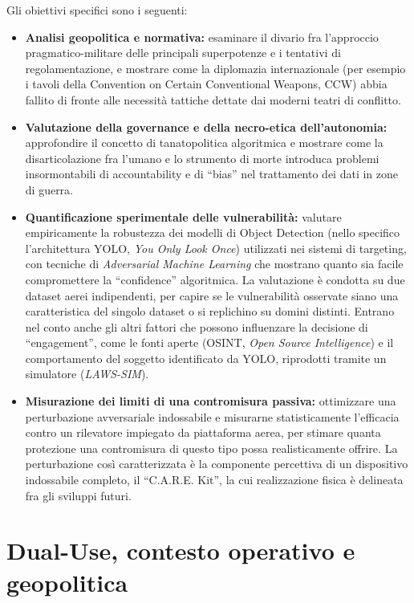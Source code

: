 \documentclass[a4paper,12pt]{report}
\begin{document}
Gli obiettivi specifici sono i seguenti:
\begin{itemize}
    \item \textbf{Analisi geopolitica e normativa:} esaminare il divario fra l'approccio pragmatico-militare delle principali superpotenze e i tentativi di regolamentazione, e mostrare come la diplomazia internazionale (per esempio i tavoli della Convention on Certain Conventional Weapons, CCW) abbia fallito di fronte alle necessità tattiche dettate dai moderni teatri di conflitto.
    \item \textbf{Valutazione della governance e della necro-etica dell'autonomia:} approfondire il concetto di tanatopolitica algoritmica e mostrare come la disarticolazione fra l'umano e lo strumento di morte introduca problemi insormontabili di accountability e di ``bias'' nel trattamento dei dati in zone di guerra.
    \item \textbf{Quantificazione sperimentale delle vulnerabilità:} valutare empiricamente la robustezza dei modelli di Object Detection (nello specifico l'architettura YOLO, \textit{You Only Look Once}) utilizzati nei sistemi di targeting, con tecniche di \textit{Adversarial Machine Learning} che mostrano quanto sia facile compromettere la ``confidence'' algoritmica. La valutazione è condotta su due dataset aerei indipendenti, per capire se le vulnerabilità osservate siano una caratteristica del singolo dataset o si replichino su domini distinti. Entrano nel conto anche gli altri fattori che possono influenzare la decisione di ``engagement'', come le fonti aperte (OSINT, \textit{Open Source Intelligence}) e il comportamento del soggetto identificato da YOLO, riprodotti tramite un simulatore (\textit{LAWS-SIM}).
    \item \textbf{Misurazione dei limiti di una contromisura passiva:} ottimizzare una perturbazione avversariale indossabile e misurarne statisticamente l'efficacia contro un rilevatore impiegato da piattaforma aerea, per stimare quanta protezione una contromisura di questo tipo possa realisticamente offrire. La perturbazione così caratterizzata è la componente percettiva di un dispositivo indossabile completo, il ``C.A.R.E. Kit'', la cui realizzazione fisica è delineata fra gli sviluppi futuri.
\end{itemize}
\chapter{Dual-Use, contesto operativo e geopolitica}
\label{cap1}
 
\end{document}

